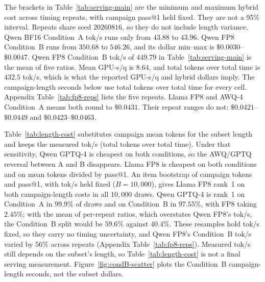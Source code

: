 \documentclass[11pt,a4paper]{article}
\begin{document}
The brackets in Table~\ref{tab:serving-main} are the minimum and maximum hybrid cost across timing repeats, with campaign pass@1 held fixed. They are not a 95\% interval. Repeats share seed $20260816$, so they do not include length variance. Qwen BF16 Condition~A tok/s runs only from $43.88$ to $43.96$. Qwen FP8 Condition~B runs from $350.68$ to $546.26$, and its dollar min--max is $\$0.0030$--$\$0.0047$. Qwen FP8 Condition~B tok/s of $449.79$ in Table~\ref{tab:serving-main} is the mean of five ratios. Mean GPU-s/q is $8.64$, and total tokens over total time is $432.5$ tok/s, which is what the reported GPU-s/q and hybrid dollars imply. The campaign-length seconds below use total tokens over total time for every cell. Appendix Table~\ref{tab:fp8-reps} lists the five repeats. Llama FP8 and AWQ-4 Condition~A means both round to $\$0.0431$. Their repeat ranges do not: $\$0.0421$--$\$0.0449$ and $\$0.0423$--$\$0.0463$.

Table~\ref{tab:length-cost} substitutes campaign mean tokens for the subset length and keeps the measured tok/s (total tokens over total time). Under that sensitivity, Qwen GPTQ-4 is cheapest on both conditions, so the AWQ/GPTQ reversal between A and B disappears. Llama FP8 is cheapest on both conditions and on mean tokens divided by pass@1. An item bootstrap of campaign tokens and pass@1, with tok/s held fixed ($B=10{,}000$), gives Llama FP8 rank~1 on both campaign-length costs in all $10{,}000$ draws. Qwen GPTQ-4 is rank~1 on Condition~A in $99.9\%$ of draws and on Condition~B in $97.55\%$, with FP8 taking $2.45\%$; with the mean of per-repeat ratios, which overstates Qwen FP8's tok/s, the Condition~B split would be $59.6\%$ against $40.4\%$. These resamples hold tok/s fixed, so they carry no timing uncertainty, and Qwen FP8's Condition~B tok/s varied by $56\%$ across repeats (Appendix Table~\ref{tab:fp8-reps}). Measured tok/s still depends on the subset's length, so Table~\ref{tab:length-cost} is not a final serving measurement. Figure~\ref{fig:condB-scatter} plots the Condition~B campaign-length seconds, not the subset dollars.
\end{document}
